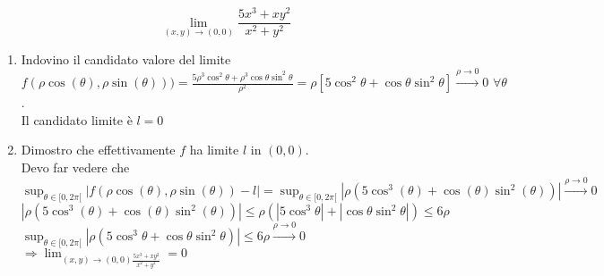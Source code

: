 \begin{exbar}
\begin{example}
	\begin{equation*}
		\lim_{(x,y)\rightarrow(0,0)}\frac{5x^3+xy^2}{x^2+y^2}
	\end{equation*}
	\begin{enumerate}
		\item Indovino il candidato valore del limite\\
		$f(\rho\cos(\theta),\rho\sin(\theta)))=\frac{5\rho^3\cos^2\theta+\rho^3\cos\theta\sin^2\theta}{\rho^2}=\rho[5\cos^2\theta+\cos\theta\sin^2\theta]\xrightarrow{\rho\rightarrow0}0\,\, \forall \theta$.\\
		Il candidato limite è $l=0$
		\item Dimostro che effettivamente $f$ ha limite $l$ in $(0,0)$.\\
		Devo far vedere che \\
		$\sup_{\theta \in [0,2\pi[} |f(\rho\cos(\theta),\rho\sin(\theta))-l|=\sup_{\theta\in[0,2\pi[} |\rho(5\cos^3(\theta)+\cos(\theta)\sin^2(\theta))|\xrightarrow{\rho\rightarrow0}0$\\
		$|\rho(5\cos^3(\theta)+\cos(\theta)\sin^2(\theta))|\leq \rho(|5\cos^3\theta|+|\cos\theta\sin^2\theta|)\leq 6\rho$\\
		$\sup_{\theta\in[0,2\pi[}|\rho(5\cos^3\theta+\cos\theta\sin^2\theta)|\leq 6\rho \xrightarrow{\rho\rightarrow0}0$\\
		$\Rightarrow \lim_{(x,y)\rightarrow(0,0)\frac{5x^3+xy^2}{x^2+y^2}}=0$
	\end{enumerate}
\end{example}
\end{exbar}


